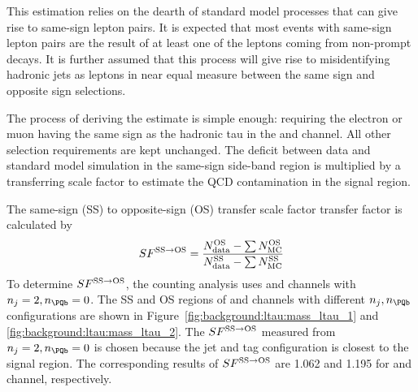 This estimation relies on the dearth of standard model processes that can give rise to same-sign lepton pairs.  It is expected that most events with same-sign lepton pairs are the result of at least one of the leptons coming from non-prompt decays.  It is further assumed that this process will give rise to misidentifying hadronic jets as leptons in near equal measure between the same sign and opposite sign selections.  

The process of deriving the estimate is simple enough: requiring the electron or muon having the same sign as the hadronic tau in the \cet and \cmt channel. All other selection requirements are kept unchanged. The deficit between data and standard model simulation in the same-sign side-band region is multiplied by a transferring scale factor to estimate the QCD contamination in the signal region. 


The same-sign (SS) to opposite-sign (OS) transfer scale factor transfer factor is calculated by
\begin{equation}
    SF^{\rm SS \to OS} = \frac{N^{\rm OS}_{\rm data} - \sum N^{\rm OS}_{\rm MC} }{ N^{\rm SS}_{\rm data} - \sum N^{\rm SS}_{\rm MC} }
\end{equation}
\noindent To determine $SF^{\rm SS \to OS}$, the counting analysis uses \cet and \cmt channels with $n_j=2,n_\PQb=0$. The SS and OS regions of \cet and \cmt channels with different $n_j,n_\PQb$ configurations are shown in Figure~\ref{fig:background:ltau:mass_ltau_1} and \ref{fig:background:ltau:mass_ltau_2}. The $SF^{\rm SS \to OS}$ measured from $n_j=2,n_\PQb=0$ is chosen because the jet and \PQb tag configuration is closest to the signal region. The corresponding results of $SF^{\rm SS \to OS}$ are 1.062 and 1.195 for \cet and \cmt channel, respectively.



